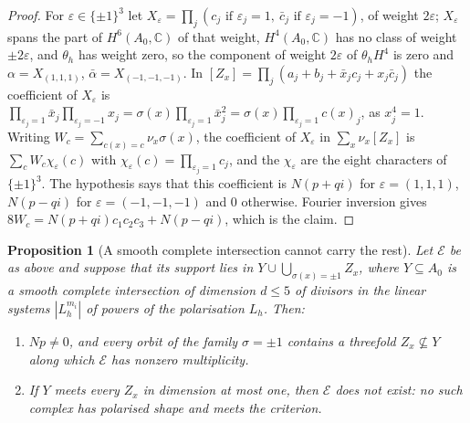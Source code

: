 \documentclass[11pt,reqno]{amsart}
\numberwithin{equation}{section}
\theoremstyle{plain}
\newtheorem{proposition}[theorem]{Proposition}
\theoremstyle{definition}
\newcommand{\CC}{\mathbb{C}}
\begin{document}
\begin{proof}
For $\varepsilon\in\{\pm1\}^{3}$ let $X_{\varepsilon}=\prod_{j}(c_{j}\text{ if }\varepsilon_{j}=1,\ \bar c_{j}\text{ if }\varepsilon_{j}=-1)$, of weight $2\varepsilon$; $X_{\varepsilon}$ spans the part of $H^{6}(A_{0},\CC)$ of that weight, $H^{4}(A_{0},\CC)$ has no class of weight $\pm2\varepsilon$, and $\theta_{h}$ has weight zero, so the component of weight $2\varepsilon$ of $\theta_{h}H^{4}$ is zero and $\alpha=X_{(1,1,1)}$, $\bar\alpha=X_{(-1,-1,-1)}$. In $[Z_{x}]=\prod_{j}(a_{j}+b_{j}+\bar x_{j}c_{j}+x_{j}\bar c_{j})$ the coefficient of $X_{\varepsilon}$ is $\prod_{\varepsilon_{j}=1}\bar x_{j}\prod_{\varepsilon_{j}=-1}x_{j}=\sigma(x)\prod_{\varepsilon_{j}=1}\bar x_{j}^{2}=\sigma(x)\prod_{\varepsilon_{j}=1}c(x)_{j}$, as $x_{j}^{4}=1$. Writing $W_{c}=\sum_{c(x)=c}\nu_{x}\sigma(x)$, the coefficient of $X_{\varepsilon}$ in $\sum_{x}\nu_{x}[Z_{x}]$ is $\sum_{c}W_{c}\chi_{\varepsilon}(c)$ with $\chi_{\varepsilon}(c)=\prod_{\varepsilon_{j}=1}c_{j}$, and the $\chi_{\varepsilon}$ are the eight characters of $\{\pm1\}^{3}$. The hypothesis says that this coefficient is $N(p+qi)$ for $\varepsilon=(1,1,1)$, $N(p-qi)$ for $\varepsilon=(-1,-1,-1)$ and $0$ otherwise. Fourier inversion gives $8W_{c}=N(p+qi)c_{1}c_{2}c_{3}+N(p-qi)$, which is the claim.
\end{proof}

\begin{proposition}[A smooth complete intersection cannot carry the rest]\label{prop:ci}
Let $\mathcal{E}$ be as above and suppose that its support lies in $Y\cup\bigcup_{\sigma(x)=\pm1}Z_{x}$, where $Y\subseteq A_{0}$ is a smooth complete intersection of dimension $d\le5$ of divisors in the linear systems $|L_{h}^{m_{i}}|$ of powers of the polarisation $L_{h}$. Then:
\begin{enumerate}
\item[(i)] $Np\ne0$, and every orbit of the family $\sigma=\pm1$ contains a threefold $Z_{x}\not\subseteq Y$ along which $\mathcal{E}$ has nonzero multiplicity.
\item[(ii)] If $Y$ meets every $Z_{x}$ in dimension at most one, then $\mathcal{E}$ does not exist: no such complex has polarised shape and meets the criterion.
\end{enumerate}
\end{proposition}
\end{document}
